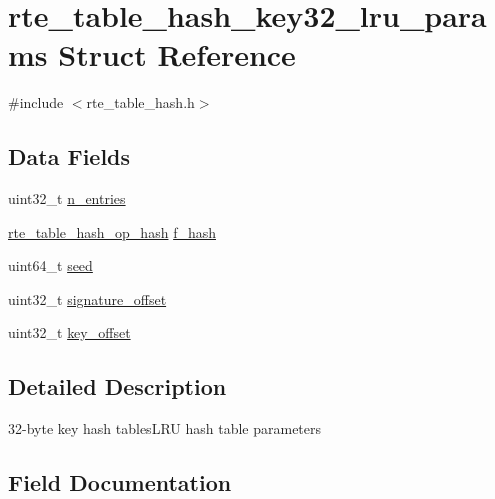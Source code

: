 \hypertarget{structrte__table__hash__key32__lru__params}{}\section{rte\+\_\+table\+\_\+hash\+\_\+key32\+\_\+lru\+\_\+params Struct Reference}
\label{structrte__table__hash__key32__lru__params}


{\ttfamily \#include $<$rte\+\_\+table\+\_\+hash.\+h$>$}

\subsection*{Data Fields}
\begin{DoxyCompactItemize}
\item 
uint32\+\_\+t \hyperlink{structrte__table__hash__key32__lru__params_aafba5a1f8ad65b41148894026098cad7}{n\+\_\+entries}
\item 
\hyperlink{rte__table__hash_8h_a6633f20f58e850abc3d1650af5d900da}{rte\+\_\+table\+\_\+hash\+\_\+op\+\_\+hash} \hyperlink{structrte__table__hash__key32__lru__params_a5a7373267cebe4384507b331c883624a}{f\+\_\+hash}
\item 
uint64\+\_\+t \hyperlink{structrte__table__hash__key32__lru__params_a13dfa5fcb8e1184f1f7756e717fd2807}{seed}
\item 
uint32\+\_\+t \hyperlink{structrte__table__hash__key32__lru__params_a255e199334632db5019afe0eb166a05a}{signature\+\_\+offset}
\item 
uint32\+\_\+t \hyperlink{structrte__table__hash__key32__lru__params_aa09132fc271bc1be2e4032587665bcf7}{key\+\_\+offset}
\end{DoxyCompactItemize}


\subsection{Detailed Description}
32-\/byte key hash tables\+L\+R\+U hash table parameters 

\subsection{Field Documentation}
\hypertarget{structrte__table__hash__key32__lru__params_a5a7373267cebe4384507b331c883624a}{}
